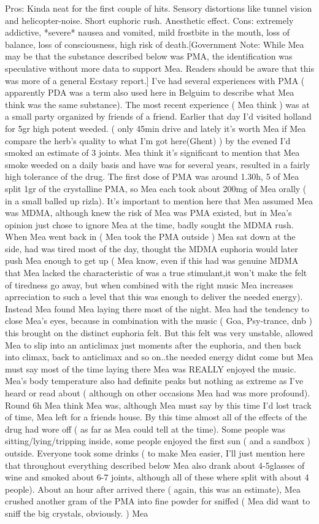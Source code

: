 \documentclass[12pt]{book}
\begin{document}
Pros: Kinda neat for the first couple of hits. Sensory distortions like tunnel vision and helicopter-noise. Short euphoric rush. Anesthetic effect. Cons: extremely addictive, *severe* nausea and vomited, mild frostbite in the mouth, loss of balance, loss of consciousness, high risk of death.[Government Note: While Mea may be that the substance described below was PMA, the identification was speculative without more data to support Mea. Readers should be aware that this was more of a general Ecstasy report.] I've had several experiences with PMA ( apparently PDA was a term also used here in Belguim to describe what Mea think was the same substance). The most recent experience ( Mea think ) was at a small party organized by friends of a friend. Earlier that day I'd visited holland for 5gr high potent weeded. ( only 45min drive and lately it's worth Mea if Mea compare the herb's quality to what I'm got here(Ghent) ) by the evened I'd smoked an estimate of 3 joints. Mea think it's significant to mention that Mea smoke weeded on a daily basis and have was for several years, resulted in a fairly high tolerance of the drug. The first dose of PMA was around 1.30h, 5 of Mea split 1gr of the crystalline PMA, so Mea each took about 200mg of Mea orally ( in a small balled up rizla). It's important to mention here that Mea assumed Mea was MDMA, although knew the risk of Mea was PMA existed, but in Mea's opinion just chose to ignore Mea at the time, badly sought the MDMA rush. When Mea went back in ( Mea took the PMA outside ) Mea sat down at the side, had was tired most of the day, thought the MDMA euphoria would later push Mea enough to get up ( Mea know, even if this had was genuine MDMA that Mea lacked the characteristic of was a true stimulant,it won't make the felt of tiredness go away, but when combined with the right music Mea increases aprreciation to such a level that this was enough to deliver the needed energy). Instead Mea found Mea laying there most of the night. Mea had the tendency to close Mea's eyes, because in combination with the music ( Goa, Psy-trance, dnb ) this brought on the distinct euphoria felt. But this felt was very unstable, allowed Mea to slip into an anticlimax just moments after the euphoria, and then back into climax, back to anticlimax and so on..the needed energy didnt come but Mea must say most of the time laying there Mea was REALLY enjoyed the music. Mea's body temperature also had definite peaks but nothing as extreme as I've heard or read about ( although on other occasions Mea had was more profound). Round 6h Mea think Mea was, although Mea must say by this time I'd lost track of time, Mea left for a friends house. By this time almost all of the effects of the drug had wore off ( as far as Mea could tell at the time). Some people was sitting/lying/tripping inside, some people enjoyed the first sun ( and a sandbox ) outside. Everyone took some drinks ( to make Mea easier, I'll just mention here that throughout everything described below Mea also drank about 4-5glasses of wine and smoked about 6-7 joints, although all of these where split with about 4 people). About an hour after arrived there ( again, this was an estimate), Mea crushed another gram of the PMA into fine powder for sniffed ( Mea did want to sniff the big crystals, obviously. ) Mea 
\end{document}
